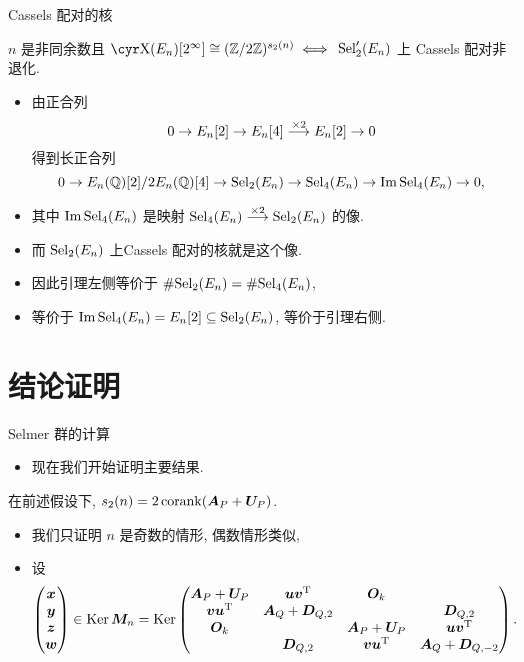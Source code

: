 \documentclass[handout,aspectratio=169]{ctexbeamer}
\begin{document}
\begin{frame}{Cassels 配对的核}
	\onslide<+->
	\begin{lemma}[][Wang2016]
		$n$ 是非同余数且 $\Sha(E_n)[2^\infty]\cong(\BZ/2\BZ)^{s_2(n)}\iff$
		$\Sel_2'(E_n)$ 上 Cassels 配对非退化.
	\end{lemma}
	\begin{itemize}
		\item 由正合列
		\[
			0\ra E_n[2]\ra E_n[4] \sto{\times 2} E_n[2]\ra 0
		\]
		得到长正合列
		\[
			0\ra {E_n(\BQ)[2]}/{2E_n(\BQ)[4]}\ra \Sel_2(E_n)\ra \Sel_4(E_n)\ra \Im \Sel_4(E_n)\ra 0,
		\]
		\item 其中 $\Im \Sel_4(E_n)$ 是映射 $\Sel_4(E_n)\sto{\times 2} \Sel_2(E_n)$ 的像.
		\item 而 $\Sel_2(E_n)$ 上Cassels 配对的核就是这个像.
		\item 因此引理左侧等价于 $\#\Sel_2(E_n) = \#\Sel_4(E_n)$, 
		\item 等价于 $\Im \Sel_4(E_n)=E_n[2]\subseteq \Sel_2(E_n)$, 等价于引理右侧.
	\end{itemize}
\end{frame}


\section{结论证明}
\begin{frame}{Selmer 群的计算}
	\begin{itemize}
		\item 现在我们开始证明主要结果.
	\end{itemize}
	\onslide<+->
	\begin{lemma}
		在前述假设下, $s_2(n)=2\corank(\bfA_P+\bfU_P)$.
	\end{lemma}
	\begin{itemize}
		\item 我们只证明 $n$ 是奇数的情形, 偶数情形类似,
		\item 设
		\[
			\begin{pmatrix}
				\bfx\\\bfy\\\bfz\\\bfw
			\end{pmatrix}\in\Ker\bfM_n
			=\Ker\begin{pmatrix}
				\bfA_P+\bfU_P&\bfu\bfv^\rmT&\bfO_k&\\
				\bfv\bfu^\rmT&\bfA_Q+\bfD_{Q,2}&&\bfD_{Q,2}\\
				\bfO_k&&\bfA_P+\bfU_P&\bfu\bfv^\rmT\\
				&\bfD_{Q,2}&\bfv\bfu^\rmT&\bfA_Q+\bfD_{Q,-2}
			\end{pmatrix}.
		\]
	\end{itemize}
\end{frame}
	
\end{document}
